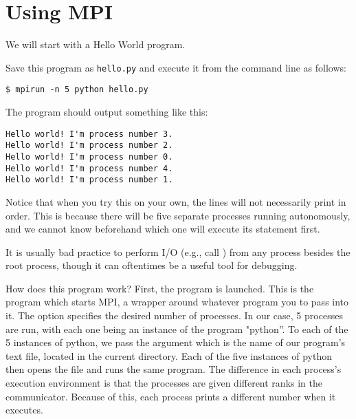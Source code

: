 \section*{Using MPI}
We will start with a Hello World program.

Save this program as \texttt{hello.py} and execute it from the command line as follows:
\begin{lstlisting}[style=ShellInput]
$ mpirun -n 5 python hello.py
\end{lstlisting}
The program should output something like this:
\begin{lstlisting}[style=ShellOutput]
Hello world! I'm process number 3.
Hello world! I'm process number 2.
Hello world! I'm process number 0.
Hello world! I'm process number 4.
Hello world! I'm process number 1.
\end{lstlisting}
Notice that when you try this on your own, the lines will not necessarily print in order. 
This is because there will be five separate processes running autonomously, and we cannot know beforehand which one will execute its  statement first.

\begin{warn}
It is usually bad practice to perform I/O (e.g., call ) from any process besides the root process, though it can oftentimes be a useful tool for debugging.
\end{warn}

How does this program work?
First, the  program is launched. 
This is the program which starts MPI, a wrapper around whatever program you to pass into it. 
The  option specifies the desired number of processes. 
In our case, 5 processes are run, with each one being an instance of the program "python''. 
To each of the 5 instances of python, we pass the argument  which is the name of our program's text file, located in the current directory. 
Each of the five instances of python then opens the  file and runs the same program. 
The difference in each process's execution environment is that the processes are given different ranks in the communicator. 
Because of this, each process prints a different number when it executes.

